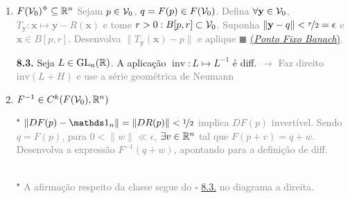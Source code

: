 \begin{enumerate}[left = 0.1cm]
\hypertarget{thmPFB}{}
\begin{theorem}
    Se \(X\ce\subseteq \R^n\) e \(T:X\to X\) é uma contração, então \(\exists! \ x^*\in X \) tal que \(T(x^*)= x^*\) e \(\forall x_0 \in X, \ \lim\limits_{n\to \infty} T^n(x_0) = x^*\).   
\end{theorem}
\item[] \begin{tcolorbox}[colframe=gray, colback=white, boxrule = 0.8pt]
    \centering \(F(\V_0)\ab \subseteq \R^n\) 
    \tcblower 
    \textcolor{gray}{Sejam \(p \in \mathcal{V}_0\), \(q = F(p) \in F(\mathcal{V}_0)\). Defina \(\forall \textbf{y} \in \mathcal{V}_0 \), \(T_{\textbf{y}}: \textbf{x} \mapsto  \textbf{y} - R(\textbf{x})\) e tome \(r>0 : B[p,r] \subset \mathcal{V}_0\). Suponha \(\|\textbf{y}- q\|<\nicefrac{r}{2} = \epsilon\) e \(\textbf{x} \in B[p,r]\). Desenvolva \(\|T_{\textbf{y}}(\textbf{x}) - p\|\) e aplique \(\blacksquare\) \hyperlink{thmPFB}{(\emph{Ponto Fixo Banach})}. }%
\end{tcolorbox}
\hypertarget{lemma83}{}
\begin{lemma}
    \textbf{8.3.} Seja \(L \in \operatorname{GL}_n(\mathbb{R})\). A aplicação \(\operatorname{inv}: L \mapsto L^{-1} \) é diff. \textcolor{gray}{\(\rightarrow \) Faz direito \(\text{inv}(L+H)\) e use a série geométrica de Neumann}    
\end{lemma}
\item[] \begin{tcolorbox}[colframe=gray, colback=white, boxrule = 0.8pt]
    \centering \(F^{-1} \in C^k(F(\mathcal{V}_0), \mathbb{R}^n)\) %
    \tcblower
    \textcolor{gray}{ \parbox[a]{0.63\linewidth}{{\small \(^\bullet\)} \(\|DF(p)- \id_{n}\| = \|DR(p)\| < \nicefrac{1}{2}\) implica \(DF(p)\) invertível. Sendo \(q = F(p)\), para \(0<\|w\| \ll \epsilon\), \(\exists v\in \mathbb{R}^n\) tal que \(F(p+v) = q+w\). Desenvolva a expressão \(F^{-1}(q+w)\), apontando para a definição de diff.  }
    \parbox[b]{0.4\linewidth}{ \- } \\  
    {\small \(^\bullet\)} A afirmação respeito da classe segue do {\scriptsize \(\square\)} \hyperlink{lemma83}{8.3.} no diagrama a direita.
    }
\end{tcolorbox}
\end{enumerate}
